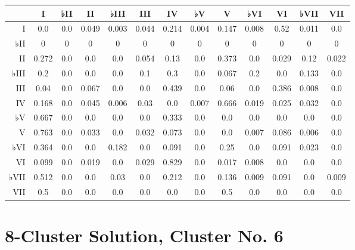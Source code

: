 \begin{table}[htbp]
\begin{minipage}{\linewidth}
\setlength{\tymax}{0.5\linewidth}
\centering
\small
\begin{tabulary}{\textwidth}{@{}RCCCCCCCCCCCC@{}} \toprule
&I&♭II&II&♭III&III&IV&♭V&V&♭VI&VI&♭VII&VII\\
\midrule
I&0.0&0.0&0.049&0.003&0.044&0.214&0.004&0.147&0.008&0.52&0.011&0.0\\
♭II&0&0&0&0&0&0&0&0&0&0&0&0\\
II&0.272&0.0&0.0&0.0&0.054&0.13&0.0&0.373&0.0&0.029&0.12&0.022\\
♭III&0.2&0.0&0.0&0.0&0.1&0.3&0.0&0.067&0.2&0.0&0.133&0.0\\
III&0.04&0.0&0.067&0.0&0.0&0.439&0.0&0.06&0.0&0.386&0.008&0.0\\
IV&0.168&0.0&0.045&0.006&0.03&0.0&0.007&0.666&0.019&0.025&0.032&0.0\\
♭V&0.667&0.0&0.0&0.0&0.0&0.333&0.0&0.0&0.0&0.0&0.0&0.0\\
V&0.763&0.0&0.033&0.0&0.032&0.073&0.0&0.0&0.007&0.086&0.006&0.0\\
♭VI&0.364&0.0&0.0&0.182&0.0&0.091&0.0&0.25&0.0&0.091&0.023&0.0\\
VI&0.099&0.0&0.019&0.0&0.029&0.829&0.0&0.017&0.008&0.0&0.0&0.0\\
♭VII&0.512&0.0&0.0&0.03&0.0&0.212&0.0&0.136&0.009&0.091&0.0&0.009\\
VII&0.5&0.0&0.0&0.0&0.0&0.0&0.0&0.5&0.0&0.0&0.0&0.0\\

\bottomrule

\end{tabulary}
\end{minipage}
\end{table}

\section{8-Cluster Solution, Cluster No. 6}
\label{8-clustersolutionclusterno.6}

